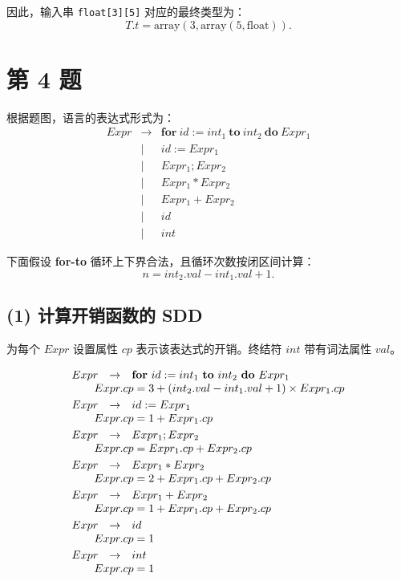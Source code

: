 \documentclass[12pt]{article}
\begin{document}
因此，输入串 \texttt{float[3][5]} 对应的最终类型为：
\[
T.t=\mathrm{array}(3,\mathrm{array}(5,\mathrm{float})).
\]

\section*{第 4 题}

根据题图，语言的表达式形式为：
\[
\begin{array}{rcl}
Expr &\to& \mathbf{for}\ id := int_1\ \mathbf{to}\ int_2\ \mathbf{do}\ Expr_1 \\
&\mid& id := Expr_1 \\
&\mid& Expr_1 ; Expr_2 \\
&\mid& Expr_1 * Expr_2 \\
&\mid& Expr_1 + Expr_2 \\
&\mid& id \\
&\mid& int
\end{array}
\]

下面假设 \textbf{for-to} 循环上下界合法，且循环次数按闭区间计算：
\[
n=int_2.val-int_1.val+1.
\]

\subsection*{(1) 计算开销函数的 SDD}

为每个 $Expr$ 设置属性 $cp$ 表示该表达式的开销。终结符 $int$ 带有词法属性 $val$。

\[
\begin{array}{rcl}
Expr &\to& \mathbf{for}\ id := int_1\ \mathbf{to}\ int_2\ \mathbf{do}\ Expr_1 \\
\multicolumn{3}{l}{\qquad Expr.cp=3+(int_2.val-int_1.val+1)\times Expr_1.cp} \\[1mm]
Expr &\to& id := Expr_1 \\
\multicolumn{3}{l}{\qquad Expr.cp=1+Expr_1.cp} \\[1mm]
Expr &\to& Expr_1 ; Expr_2 \\
\multicolumn{3}{l}{\qquad Expr.cp=Expr_1.cp+Expr_2.cp} \\[1mm]
Expr &\to& Expr_1 * Expr_2 \\
\multicolumn{3}{l}{\qquad Expr.cp=2+Expr_1.cp+Expr_2.cp} \\[1mm]
Expr &\to& Expr_1 + Expr_2 \\
\multicolumn{3}{l}{\qquad Expr.cp=1+Expr_1.cp+Expr_2.cp} \\[1mm]
Expr &\to& id \\
\multicolumn{3}{l}{\qquad Expr.cp=1} \\[1mm]
Expr &\to& int \\
\multicolumn{3}{l}{\qquad Expr.cp=1}
\end{array}
\]
\end{document}
